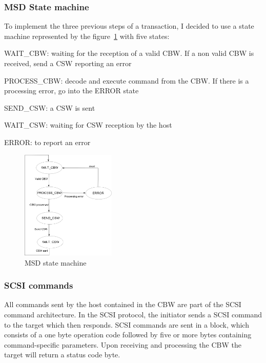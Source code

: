 \documentclass[pdftex,10pt,a4paper]{report}
\newenvironment{packed_item}{
\begin{itemize}
  \setlength{\itemsep}{1pt}
  \setlength{\parskip}{0pt}
  \setlength{\parsep}{0pt}
}{\end{itemize}}
\begin{document}
\subsubsection{MSD State machine}
To implement the three previous steps of a transaction, I decided to use a state machine represented by the figure~\ref{MSD state machine} with five states:
\begin{packed_item}
	\item WAIT\_CBW: waiting for the reception of a valid CBW. If a non valid CBW is received, send a CSW reporting an error
	\item PROCESS\_CBW: decode and execute command from the CBW. If there is a processing error, go into the ERROR state
	\item SEND\_CSW: a CSW is sent
	\item WAIT\_CSW: waiting for CSW reception by the host
	\item ERROR: to report an error
\end{packed_item}

\begin{figure}[h!]
		\centering
		\includegraphics[width=0.4\textwidth]{./msd_state_machine.jpg}
		\caption{MSD state machine}
		\label{MSD state machine}
\end{figure}


\subsubsection{SCSI commands}
All commands sent by the host contained in the CBW are part of the SCSI command architecture. In the SCSI protocol, the initiator sends a SCSI command to the target which then responds. SCSI commands are sent in a block, which consists of a one byte operation code followed by five or more bytes containing command-specific parameters. Upon receiving and processing the CBW the target will return a status code byte.\\
\end{document}
